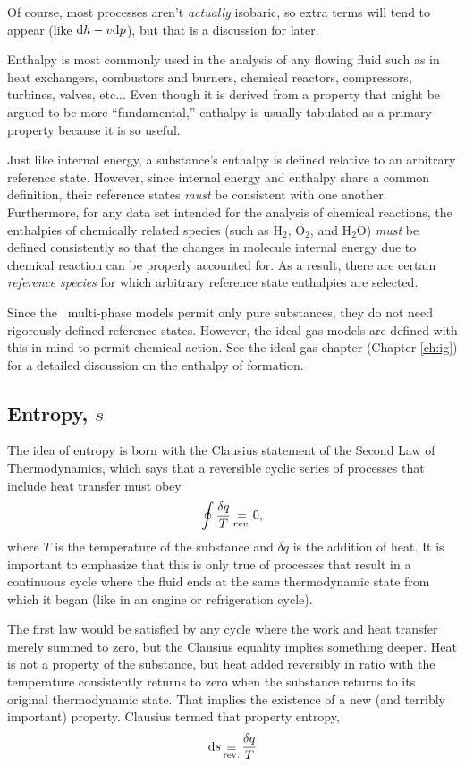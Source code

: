 Of course, most processes aren't \emph{actually} isobaric, so extra terms will tend to appear (like $\mathrm{d} h - v \mathrm{d} p$), but that is a discussion for later.

Enthalpy is most commonly used in the analysis of any flowing fluid such as in heat exchangers, combustors and burners, chemical reactors, compressors, turbines, valves, etc...  Even though it is derived from a property that might be argued to be more ``fundamental,'' enthalpy is usually tabulated as a primary property because it is so useful.

Just like internal energy, a substance's enthalpy is defined relative to an arbitrary reference state.  However, since internal energy and enthalpy share a common definition, their reference states \emph{must} be consistent with one another.  Furthermore, for any data set intended for the analysis of chemical reactions, the enthalpies of chemically related species (such as H$_2$, O$_2$, and H$_2$O) \emph{must} be defined consistently so that the changes in molecule internal energy due to chemical reaction can be properly accounted for.  As a result, there are certain \emph{reference species} for which arbitrary reference state enthalpies are selected.  

Since the \PM\ multi-phase models permit only pure substances, they do not need rigorously defined reference states.  However, the ideal gas models are defined with this in mind to permit chemical action.  See the ideal gas chapter (Chapter \ref{ch:ig}) for a detailed discussion on the enthalpy of formation.

\subsection{Entropy, $s$}\label{sec:intro:s}

The idea of entropy is born with the Clausius statement of the Second Law of Thermodynamics, which says that a reversible cyclic series of processes that include heat transfer must obey
\begin{align}
\oint \frac{\delta q}{T} \operatorname*{=}_{rev.} 0,
\end{align}
where $T$ is the temperature of the substance and $\delta q$ is the addition of heat.  It is important to emphasize that this is only true of processes that result in a continuous cycle where the fluid ends at the same thermodynamic state from which it began (like in an engine or refrigeration cycle).

The first law would be satisfied by any cycle where the work and heat transfer merely summed to zero, but the Clausius equality implies something deeper.  Heat is not a property of the substance, but heat added reversibly in ratio with the temperature consistently returns to zero when the substance returns to its original thermodynamic state.  That implies the existence of a new (and terribly important) property.  Clausius termed that property entropy,
\begin{align}
\mathrm{d} s \operatorname*{\equiv}_\mathrm{rev.} \frac{\delta q}{T}\label{eqn:intro:s}
\end{align}

